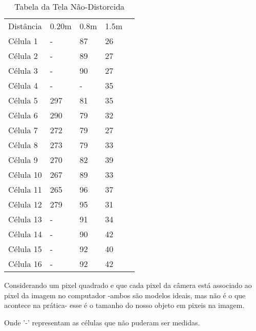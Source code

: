 \documentclass[conference,harvard,brazil,english]{sbatex}
\begin{document}
			\begin{table}[h]
				\centering
				\caption{Tabela da Tela Não-Distorcida}
				\label{my-label}
				\begin{tabular}{lllll}
					Distância & 0.20m & 0.8m & 1.5m &  \\
					Célula 1  &  -    &  87  &  26  &  \\
					Célula 2  &  -    &  89  &  27  &  \\
					Célula 3  &  -    &  90  &  27  &  \\
					Célula 4  &  -    &  -   &  35  &  \\
					Célula 5  &  297  &  81  &  35  &  \\
					Célula 6  &  290  &  79  &  32  &  \\
					Célula 7  &  272  &  79  &  27  &  \\
					Célula 8  &  273  &  79  &  33  &  \\
					Célula 9  &  270  &  82  &  39  &  \\
					Célula 10 &  267  &  89  &  33  &  \\
					Célula 11 &  265  &  96  &  37  &  \\
					Célula 12 &  279  &  95  &  31  &  \\
					Célula 13 &  -    &  91  &  34  &  \\
					Célula 14 &  -    &  90  &  42  &  \\
					Célula 15 &  -    &  92  &  40  &  \\
					Célula 16 &  -    &  92  &  42  & 
				\end{tabular}
			\end{table}
			\par Considerando um pixel quadrado e que cada pixel da câmera está associado ao pixel da imagem no computador -ambos são modelos ideais, mas não é o que acontece na prática- esse é o tamanho do nosso objeto em pixeis na imagem.
			\par Onde '-' representam as células que não puderam ser medidas.
\end{document}
